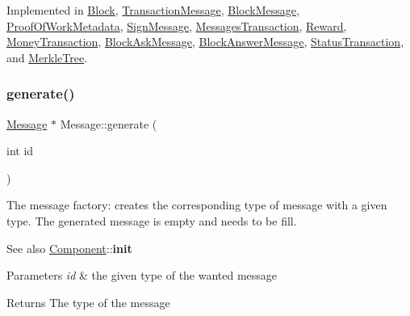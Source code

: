 Implemented in \mbox{\hyperlink{classBlock_ab21c6536cf7a26fdf2a2e889a84fcb9d}{Block}}, \mbox{\hyperlink{classTransactionMessage_a2fbe322d67154d3bcbcc44943eeeb1ef}{Transaction\+Message}}, \mbox{\hyperlink{classBlockMessage_adda957e60057d72e1bc55d7b9c617188}{Block\+Message}}, \mbox{\hyperlink{classProofOfWorkMetadata_afac533eee3123bce72615ab90f7c9669}{Proof\+Of\+Work\+Metadata}}, \mbox{\hyperlink{classSignMessage_a35855647925ec76036ed4602743ed118}{Sign\+Message}}, \mbox{\hyperlink{classMessagesTransaction_aa70ed75ff16f6afa61d82458488069d4}{Messages\+Transaction}}, \mbox{\hyperlink{classReward_a6d16e21b60b7f11c7aaf0098a53118a2}{Reward}}, \mbox{\hyperlink{classMoneyTransaction_a6f4672dba3a75e2782d15366d9ed7a1e}{Money\+Transaction}}, \mbox{\hyperlink{classBlockAskMessage_a25875b2446d7ecc5f644c568c8f12df3}{Block\+Ask\+Message}}, \mbox{\hyperlink{classBlockAnswerMessage_affa76e8a95365baf5c9eb409a0a19b9d}{Block\+Answer\+Message}}, \mbox{\hyperlink{classStatusTransaction_aa05e4be5f990e8a9533383b3b7dc1382}{Status\+Transaction}}, and \mbox{\hyperlink{classMerkleTree_a083ad348bfd770f2400f190112ff39a3}{Merkle\+Tree}}.

\mbox{\label{classMessage_ad92a0e1cfa5b5a503ec9c61833e3e5ea}} 
\subsubsection{\texorpdfstring{generate()}{generate()}}
{\footnotesize\ttfamily \mbox{\hyperlink{classMessage}{Message}} $\ast$ Message\+::generate (\begin{DoxyParamCaption}\item[{int}]{id }\end{DoxyParamCaption})\hspace{0.3cm}{\ttfamily [static]}}

The message factory\+: creates the corresponding type of message with a given type. The generated message is empty and needs to be fill. \begin{DoxySeeAlso}{See also}
\mbox{\hyperlink{classComponent}{Component}}\+:\+:{\bfseries init}
\end{DoxySeeAlso}

\begin{DoxyParams}{Parameters}
{\em id} & the given type of the wanted message \\
\hline
\end{DoxyParams}
\begin{DoxyReturn}{Returns}
The type of the message 
\end{DoxyReturn}
\mbox{\label{classMessage_a2a576dcffd45c4574fcdf2897ec26086}} 
